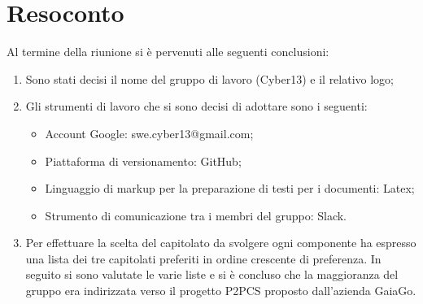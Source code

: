 \documentclass[a4paper, oneside, openany, dvipsnames, table]{article}
\begin{document}
\section{Resoconto}
Al termine della riunione si è pervenuti alle seguenti conclusioni:	
\begin{enumerate}
	\item Sono stati decisi il nome del gruppo di lavoro (Cyber13) e il relativo logo;
	\item Gli strumenti di lavoro che si sono decisi di adottare sono i seguenti:
		\begin{itemize}
			\item Account Google: swe.cyber13@gmail.com;
			\item Piattaforma di versionamento: GitHub;
			\item Linguaggio di markup per la preparazione di testi per i documenti: Latex;
			\item Strumento di comunicazione tra i membri del gruppo: Slack.
		\end{itemize}
	\item Per effettuare la scelta del capitolato da svolgere ogni componente ha espresso una lista dei tre capitolati preferiti in ordine crescente di preferenza. In seguito si sono valutate le varie liste e si è concluso che la maggioranza del gruppo era indirizzata verso il progetto P2PCS proposto dall'azienda GaiaGo. 
\end{enumerate}
\newpage
\end{document}
